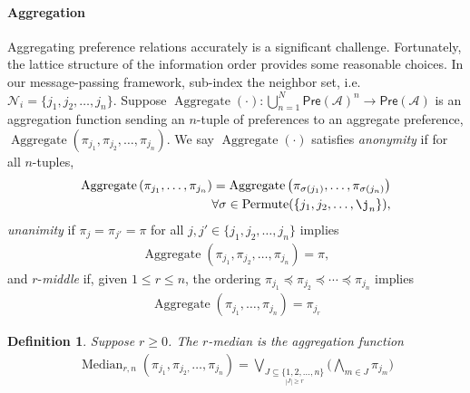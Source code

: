 \documentclass[conference]{ieeeconf}
\newcommand{\N}{\mathcal{N}}
\newcommand{\A}{\mathcal{A}}
\newcommand{\Pref}{\mathsf{Pre}}
\newcommand{\bigjoin}{\bigvee}
\newcommand{\bigmeet}{\bigwedge}
\renewcommand{\leq}{\leqslant}
\renewcommand{\geq}{\geqslant}
\DeclareMathOperator{\Aggregate}{Aggregate}
\DeclareMathOperator{\Median}{Median}
\DeclareMathOperator{\Permute}{Permute}
\newtheorem{definition}{Definition}
\begin{document}
\paragraph*{Aggregation}
Aggregating preference relations accurately is a significant challenge. Fortunately, the lattice structure of the information order provides some reasonable choices. In our message-passing framework, sub-index the neighbor set, i.e. $\N_i = \{j_1,j_2,\dots,j_n\}$. Suppose $\Aggregate(\cdot): \bigcup_{n =1}^{N} \Pref(\A)^n \to \Pref(\A)$ is an aggregation function sending an $n$-tuple of preferences to an aggregate preference, $\Aggregate(\pi_{j_1},\pi_{j_2}, \dots, \pi_{j_n})$. We say $\Aggregate(\cdot)$ satisfies \emph{anonymity} if for all $n$-tuples,
\begin{align*}
    \Aggregate\left( \pi_{j_1},\dots,\pi_{j_n}\right) = \Aggregate\left( \pi_{\sigma(j_1)},\dots,\pi_{\sigma(j_n)}\right) \\ \forall \sigma \in \Permute(\{j_1,j_2,\dots,\j_n\}),
\end{align*}
 \emph{unanimity} if $\pi_{j} = \pi_{j'} = \pi$ for all $j, j' \in \{j_1,j_2,\dots,j_n\}$ implies 
\begin{align*}
    \Aggregate\left( \pi_{j_1},\pi_{j_2},\dots,\pi_{j_n}\right) = \pi, 
\end{align*}
and $r$-\emph{middle} if, given $1 \leq r \leq n$, the ordering $\pi_{j_1} \preceq \pi_{j_2} \preceq \cdots \preceq \pi_{j_n}$ implies
\begin{align*}
    \Aggregate\left( \pi_{j_1},\dots,\pi_{j_n}\right) = \pi_{j_r} 
\end{align*}


\begin{definition}
    Suppose $r \geq 0$. The $r$-\emph{median} is the aggregation function
\begin{align}
    \Median_{r,n}\left( \pi_{j_1},\pi_{j_2,}\dots,\pi_{j_n}\right) =
    \bigjoin_{\underset{|J| \geq r }{J \subseteq \{1,2,\dots,n\}}} \biggl( \bigmeet_{m \in J} \pi_{j_m} \biggr)
\end{align} \label{eq:median}
\end{definition}
\end{document}
